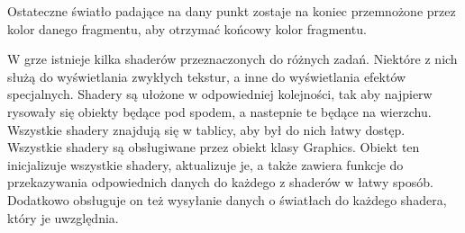 Ostateczne \'swiatło padające na dany punkt zostaje na koniec przemnożone przez kolor danego fragmentu, aby otrzymać końcowy kolor fragmentu.\bigskip

\smallskip

W grze istnieje kilka shaderów przeznaczonych do różnych zadań. Niektóre z nich służą do wy\'swietlania zwykłych tekstur, a inne do wy\'swietlania efektów specjalnych. Shadery są ułożone w odpowiedniej kolejno\'sci, tak aby najpierw rysowały się obiekty będące pod spodem, a nastepnie te będące na wierzchu. Wszystkie shadery znajdują się w tablicy, aby był do nich łatwy dostęp. Wszystkie shadery są obsługiwane przez obiekt klasy Graphics. Obiekt ten inicjalizuje wszystkie shadery, aktualizuje je, a także zawiera funkcje do przekazywania odpowiednich danych do każdego z shaderów w łatwy sposób. Dodatkowo obsługuje on też wysyłanie danych o \'swiatłach do każdego shadera, który je uwzględnia.

\cleardoublepage